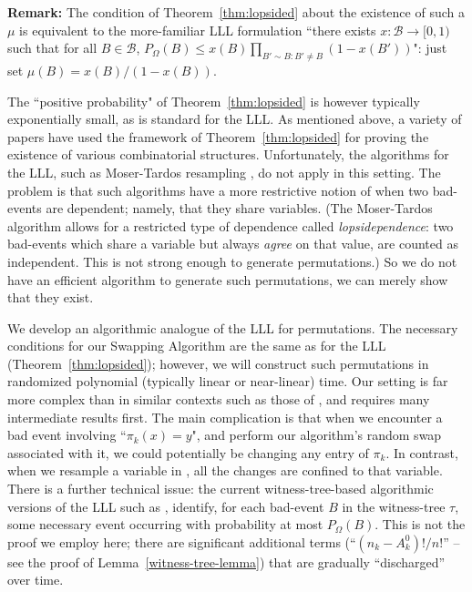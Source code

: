 \smallskip \noindent \textbf{Remark:} The condition of Theorem~\ref{thm:lopsided} about the existence of such a $\mu$ is equivalent to the more-familiar LLL formulation ``there exists $x : \mathcal B \rightarrow \mathbf [0, 1)$
such that for all $B \in \mathcal B$, 
$P_{\Omega}(B) \leq x(B) \prod_{B' \sim B: B' \not= B} (1 - x(B'))$": just set $\mu(B) = x(B)/(1 - x(B))$.

\smallskip
The ``positive probability" of Theorem~\ref{thm:lopsided} is however typically exponentially small, as is standard for the LLL. 
As mentioned above, a variety of papers have used the framework of Theorem~\ref{thm:lopsided} for proving the existence of various combinatorial structures. 
Unfortunately, the algorithms for the LLL, such as Moser-Tardos resampling \cite{moser-tardos}, do not apply in this setting. The problem is that such algorithms have a more restrictive notion of when two bad-events are dependent; namely, that they share variables. (The Moser-Tardos algorithm allows for a restricted type of dependence called \emph{lopsidependence}: two bad-events which share a variable but always \emph{agree} on that value, are counted as independent. This is not strong enough to generate permutations.) So we do not have an efficient algorithm to generate such permutations, we can merely show that they exist.

We develop an algorithmic analogue of the LLL for permutations. The necessary conditions for our Swapping Algorithm are the same as for the LLL (Theorem~\ref{thm:lopsided}); however, we will construct such permutations in randomized polynomial (typically linear or near-linear) time. Our setting is far more complex than in similar contexts such as those of \cite{moser-tardos,harris-srin2,pegden}, and requires many intermediate results first. The main complication is that when we encounter a bad event involving ``$\pi_k(x) = y$", and perform our algorithm's random swap associated with it, we could potentially be changing any entry of $\pi_k$. In contrast, when we resample a variable in \cite{moser-tardos,harris-srin2,pegden}, all the changes are confined to that variable. There is a further technical issue: the current witness-tree-based algorithmic versions of the LLL
such as \cite{moser-tardos,harris-srin2}, identify, for each bad-event $B$ in the witness-tree $\tau$, some necessary event occurring with probability at most $P_{\Omega}(B)$. This is not the proof we employ here; there are significant additional terms (``$(n_k - A_{k}^{0})!/n!$'' -- see the proof of 
Lemma~\ref{witness-tree-lemma}) that are gradually ``discharged'' over time.

